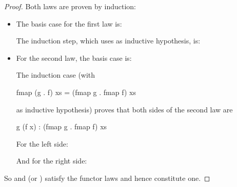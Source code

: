 \begin{example}
\begin{proof}
    Both laws are proven by induction:
    \begin{itemize}
    \item
      The basis case for the first law is:
      \begin{steps}
        \steph{[]}
      \end{steps}
      The induction step, which uses  as
      inductive hypothesis, is:
      \begin{steps}
          \eqbyihh
      \end{steps}
    \item
      For the second law, the basis case is:
      \begin{steps}
        \steph{[]}
      \end{steps}
      The induction case (with
      \begin{codehaskell}
        fmap (g . f) xs = (fmap g . fmap f) xs
      \end{codehaskell}
      as inductive hypothesis) proves that both sides of
      the second law are
      \begin{codehaskell}
        g (f x) : (fmap g . fmap f) xs
      \end{codehaskell}
      For the left side:
      \begin{steps}
          \eqbyihh
      \end{steps}
      And for the right side:
      \begin{steps}
      \end{steps}
    \end{itemize}
    So \texthaskell{[]} and  (or ) satisfy the
    functor laws and hence constitute one.

  \end{proof}

\end{example}


